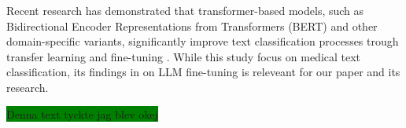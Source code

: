 \documentclass{article}
\begin{document}
Recent research has demonstrated that transformer-based models,
such as Bidirectional Encoder Representations from Transformers (BERT) and other domain-specific variants,
significantly improve text classification processes trough transfer learning and fine-tuning \cite{Nazyrova2024}.
While this study focus on medical text classification, its findings in on LLM fine-tuning is releveant for our
paper and its research.

\colorbox{green}{Denna text tyckte jag blev okej}



\end{document}

